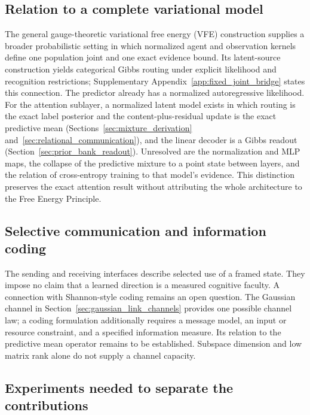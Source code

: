 \documentclass[twoside,11pt]{article}
\begin{document}
\subsection{Relation to a complete variational model}
The general gauge-theoretic variational free energy (VFE) construction supplies a broader probabilistic setting in which normalized agent and observation kernels define one population joint and one exact evidence bound. Its latent-source construction yields categorical Gibbs routing under explicit likelihood and recognition restrictions; Supplementary Appendix~\ref{app:fixed_joint_bridge} states this connection. The predictor already has a normalized autoregressive likelihood. For the attention sublayer, a normalized latent model exists in which routing is the exact label posterior and the content-plus-residual update is the exact predictive mean (Sections~\ref{sec:mixture_derivation} and~\ref{sec:relational_communication}), and the linear decoder is a Gibbs readout (Section~\ref{sec:prior_bank_readout}). Unresolved are the normalization and MLP maps, the collapse of the predictive mixture to a point state between layers, and the relation of cross-entropy training to that model's evidence. This distinction preserves the exact attention result without attributing the whole architecture to the Free Energy Principle.

\subsection{Selective communication and information coding}
The sending and receiving interfaces describe selected use of a framed state. They impose no claim that a learned direction is a measured cognitive faculty. A connection with Shannon-style coding remains an open question. The Gaussian channel in Section~\ref{sec:gaussian_link_channels} provides one possible channel law; a coding formulation additionally requires a message model, an input or resource constraint, and a specified information measure. Its relation to the predictive mean operator remains to be established. Subspace dimension and low matrix rank alone do not supply a channel capacity.

\subsection{Experiments needed to separate the contributions}
\label{sec:needed_experiments}
\end{document}
